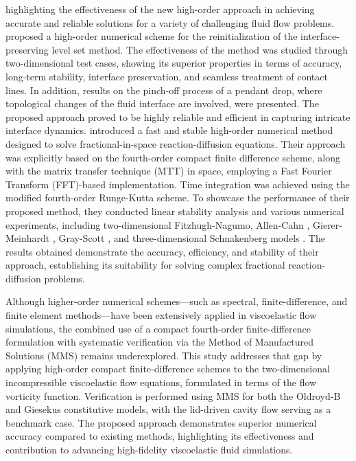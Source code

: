 \documentclass[preprint, 12pt]{elsarticle}
\begin{document}
highlighting the effectiveness of the new high-order approach in achieving accurate and reliable solutions for a variety of challenging fluid flow problems. \citet{ZHANG2019634}  proposed a high-order numerical scheme for the reinitialization of the interface-preserving level set method. The effectiveness of the method was studied through two-dimensional test cases, showing its superior properties in terms of accuracy, long-term stability, interface preservation, and seamless treatment of contact lines. In addition, results on the pinch-off process of a pendant drop, where topological changes of the fluid interface are involved, were presented. The proposed approach proved to be highly reliable and efficient in capturing intricate interface dynamics. \citet{ALMUSHAIRA2021235} introduced a fast and stable high-order numerical method designed to solve fractional-in-space reaction-diffusion equations. Their approach was explicitly based on the fourth-order compact finite difference scheme, along with the matrix transfer technique (MTT) in space, employing a Fast Fourier Transform (FFT)-based implementation. Time integration was achieved using the modified fourth-order Runge-Kutta scheme. To showcase the performance of their proposed method, they conducted linear stability analysis and various numerical experiments, including two-dimensional Fitzhugh-Nagumo, Allen-Cahn \citep{Allen1972}, Gierer-Meinhardt \citep{Gierer1972}, Gray-Scott \citep{Gray1984}, and three-dimensional Schnakenberg models \citep{Schnakenberg1979}. The results obtained demonstrate the accuracy, efficiency, and stability of their approach, establishing its suitability for solving complex fractional reaction-diffusion problems.

Although higher-order numerical schemes—such as spectral, finite-di\-ffe\-ren\-ce, and finite element methods—have been extensively applied in viscoelastic flow simulations, the combined use of a compact fourth-order finite-difference formulation with systematic verification via the Method of Manufactured Solutions (MMS) remains underexplored. This study addresses that gap by applying high-order compact finite-difference schemes to the two-dimensional incompressible viscoelastic flow equations, formulated in terms of the flow vorticity function. Verification is performed using MMS for both the Oldroyd-B and Giesekus constitutive models, with the lid-driven cavity flow serving as a benchmark case. The proposed approach demonstrates superior numerical accuracy compared to existing methods, highlighting its effectiveness and contribution to advancing high-fidelity viscoelastic fluid simulations.
\end{document}
